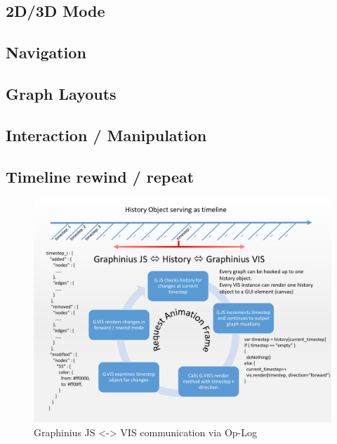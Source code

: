 	\subsection{2D/3D Mode}
	\label{ssect:vis_2d3d}
	
	\subsection{Navigation}
	\label{ssect:vis_navigation}
	
	\subsection{Graph Layouts}
	\label{ssect:vis_layouts}	
	
	\subsection{Interaction / Manipulation}
	\label{ssect:vis_interact_manipulate}
	
	\subsection{Timeline rewind / repeat}
	\label{ssect:vis_timeline}


\begin{landscape}
\begin{figure}[ht]
	\label{fig_history_workflow}
	\centering
	\vspace{-2.0cm}
	\includegraphics[width=1.6\textwidth]{figures/History_Workflow_pdf}
	\caption{Graphinius JS <-> VIS communication via Op-Log}
\end{figure}
\end{landscape}


